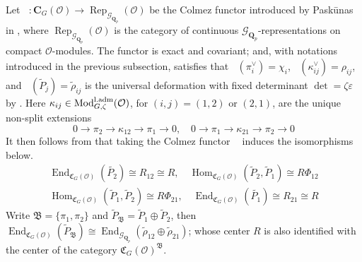 \documentclass[leqno]{amsart}
\newcommand{\laMod}{\textnormal{Mod}^{\textnormal{l.adm}}}
\DeclareMathOperator{\Rep}{Rep}
\newcommand{\B}{\mathfrak B}
\newcommand{\fC}{\mathfrak C}
\DeclareMathOperator{\V}{\check{\mathbf{V}}} %
\newcommand{\Gp}{\mathcal{G}_{\Qp}} %
\newcommand{\Qp}{\mathbf{Q}_p}
\newcommand{\C}{\mathbf C}
\newcommand{\oo}{\mathcal{O}} %
\DeclareMathOperator{\End}{End}
\DeclareMathOperator{\Hom}{Hom}
\theoremstyle{definition}
\theoremstyle{remark}
\begin{document}
Let $\V\colon \C_G(\oo)\to \Rep_{\Gp}(\oo)$
be the Colmez functor introduced by Pask\={u}nas
in \cite[\S 5.7]{pask},
where 
$\Rep_{\Gp}(\oo)$
is the category of continuous $\Gp$-representations
on compact $\oo$-modules.
The functor is exact and covariant;
and, with notations introduced 
in the previous subsection, satisfies that
$\V(\pi_i^\vee)=\chi_i$,
$\V(\kappa_{ij}^\vee)=\rho_{ij}$,
and $\V(\tilde{P}_j)=\tilde{\rho}_{ij}$
is the universal deformation
with fixed determinant $\det=\zeta\varepsilon$
by \cite[Cor 8.7]{pask}.
Here
$\kappa_{ij}\in \laMod_{G,\zeta}(\oo)$,
for $(i,j)=(1,2)$ or  $(2,1)$,
are the unique non-split extensions
\[
	0\to \pi_2\to \kappa_{12}\to \pi_1\to 0,\quad
	0\to \pi_1\to \kappa_{21}\to \pi_2\to 0
\]
It then follows from \cite[Lem 8.10]{pask} that 
taking the Colmez functor 
$\V$ induces the isomorphisms below.
\begin{equation}\label{eq:end_def}
\begin{split}
	\End_{\fC_{G}(\oo)}(\tilde{P_2})\cong R_{12}\cong R,\quad
	\Hom_{\fC_G(\oo)}(\tilde{P}_2, \tilde{P}_1)\cong R\Phi_{12}\\
	\Hom_{\fC_G(\oo)}(\tilde{P}_1, \tilde{P}_2)\cong R\Phi_{21},\quad
	\End_{\fC_{G}(\oo)}(\tilde{P_1})\cong R_{21}\cong R
\end{split}
\end{equation}
Write $\B=\{\pi_1,\pi_2\}$ 
and $ \tilde{P}_\B=\tilde{P}_1\oplus \tilde{P}_2$,
then $\End_{\fC_G(\oo)}(\tilde{P}_\B)\cong 
\End_{\Gp}(\tilde{\rho}_{12}\oplus \tilde{\rho}_{21})$;
whose center $R$ is also identified with 
the center of the category $\fC_G(\oo)^\B$.
\end{document}
